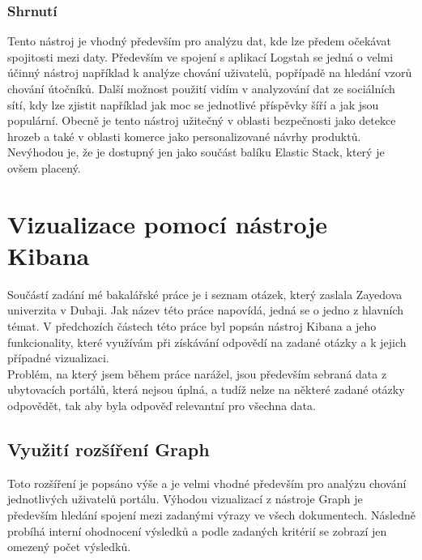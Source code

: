 \documentclass[czech,BP]{thesiskiv}
\begin{document}
\subsection{Shrnutí}
Tento nástroj je vhodný především pro analýzu dat, kde lze předem očekávat spojitosti mezi daty. Především ve spojení s aplikací Logstah se jedná o velmi účinný nástroj například k analýze chování uživatelů, popřípadě na hledání vzorů chování útočníků. Další možnost použití vidím v analyzování dat ze sociálních sítí, kdy lze zjistit například jak moc se jednotlivé příspěvky šíří a jak jsou populární. Obecně je tento nástroj užitečný v oblasti bezpečnosti jako detekce hrozeb a také v oblasti komerce jako personalizované návrhy produktů. Nevýhodou je, že je dostupný jen jako součást balíku Elastic Stack, který je ovšem placený.


\chapter{Vizualizace pomocí nástroje Kibana}
Součástí zadání mé bakalářské práce je i seznam otázek, který zaslala Zayedova univerzita v Dubaji. Jak název této práce napovídá, jedná se o jedno z hlavních témat. V předchozích částech této práce byl popsán nástroj Kibana a jeho funkcionality, které využívám při získávání odpovědí na zadané otázky a k jejich případné vizualizaci.
\\
Problém, na který jsem během práce narážel, jsou především sebraná data z ubytovacích portálů, která nejsou úplná, a tudíž nelze na některé zadané otázky odpovědět, tak aby byla odpověď relevantní pro všechna data.
\section{Využití rozšíření Graph}
Toto rozšíření je popsáno výše a je velmi vhodné především pro analýzu chování jednotlivých uživatelů portálu. Výhodou vizualizací z nástroje Graph je především hledání spojení mezi zadanými výrazy ve všech dokumentech. Následně probíhá interní ohodnocení výsledků a podle zadaných kritérií se zobrazí jen omezený počet výsledků.
\end{document}
